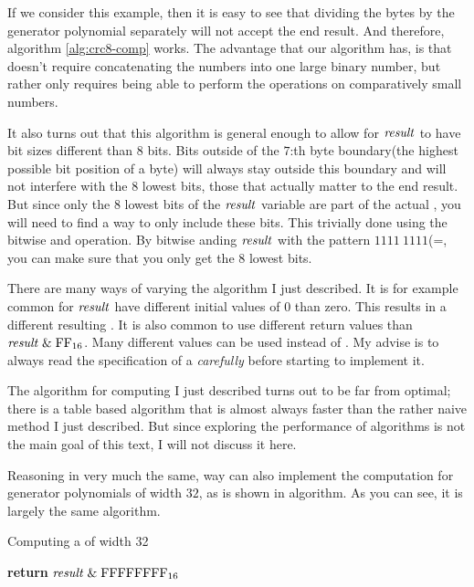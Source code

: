 If we consider this example, then it is easy to see that dividing the
bytes by the generator polynomial separately will not accept the end
result. And therefore, algorithm \ref{alg:crc8-comp} works. The
advantage that our algorithm has, is that doesn't require
concatenating the numbers into one large binary number, but rather
only requires being able to perform the operations on comparatively
small numbers.

It also turns out that this algorithm is general enough to allow for
$\mathit{result}$ to have bit sizes different than 8 bits. Bits outside of the
$7$:th byte boundary(the highest possible bit position of a byte) will
always stay outside this boundary and will not interfere with the 8
lowest bits, those that actually matter to the end result. But since
only the 8 lowest bits of the $\mathit{result}$ variable are part of the actual
\crc, you will need to find a way to only include these bits. This
trivially done using the bitwise and operation. By bitwise anding
$\mathit{result}$ with the pattern $1111\ 1111$(=, you can make sure
that you only get the 8 lowest bits.

There are many ways of varying the algorithm I just described. It is
for example common for $\mathit{result}$ have different initial values of
$0$ than zero. This results in a different resulting \crc. It is also
common to use different return values than $\mathit{result} \mathrel{\&}
\mbox{\ensuremath{\mathrm{FF}_{16}}}$. Many different values can be used instead of . My
advise is to always read the specification of a \crc
\textit{carefully} before starting to implement it.

The algorithm for computing \crc I just described turns out to be far
from optimal; there is a table based algorithm that is almost always
faster than the rather naive method I just described. But since
exploring the performance of algorithms is not the main goal of this
text, I will not discuss it here.

Reasoning in very much the same, way can also implement the \crc
computation for generator polynomials of width $32$, as is shown in
algorithm. As you can see, it is largely the same algorithm.

\begin{algorithm}[H]
  \caption{Computing a \crc of width 32}
  \label{alg:crc32-comp}
  \begin{algorithmic}[1]


    \Else
    \EndIf
    \EndRepeatn

    \EndForEach

    \State \textbf{return}  $\mathit{result} \mathrel{\&} \mbox{\ensuremath{\mathrm{FFFFFFFF}_{16}}}$
    \EndProcedure

  \end{algorithmic}
\end{algorithm}

